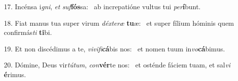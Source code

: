 17. Incénsa i\textit{gni}, \textit{et} \textit{suf}\textbf{fós}sa: \ast\  ab increpatióne vultus tui \textit{per}\textbf{í}bunt.\

18. Fiat manus tua super virum \textit{déx}\textit{te}\textit{ræ} \textbf{tu}æ: \ast\  et super fílium hóminis quem confirmás\textit{ti} \textbf{ti}bi.\

19. Et non discédimus a te, \textit{vi}\textit{vi}\textit{fi}\textbf{cá}bis nos: \ast\  et nomen tuum in\textit{vo}\textbf{cá}bimus.\

20. Dómine, Deus vir\textit{tú}\textit{tum}, \textit{con}\textbf{vér}te nos: \ast\  et osténde fáciem tuam, et sal\textit{vi} \textbf{é}rimus.\

